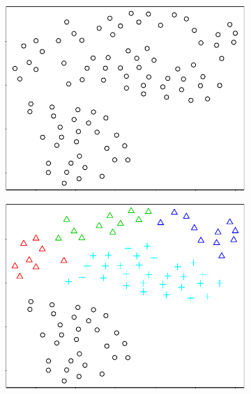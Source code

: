 \begin{figure}[H]
\begin{subfigure}{.49\textwidth}
\includegraphics[width=\textwidth]{../simulation/plots/overclus_a}
\caption{}
\end{subfigure}
\begin{subfigure}{.49\textwidth}
\includegraphics[width=\textwidth]{../simulation/plots/overclus_c}
\caption{}
\end{subfigure}
\begin{subfigure}{.49\textwidth}

\end{subfigure}
\end{figure}
